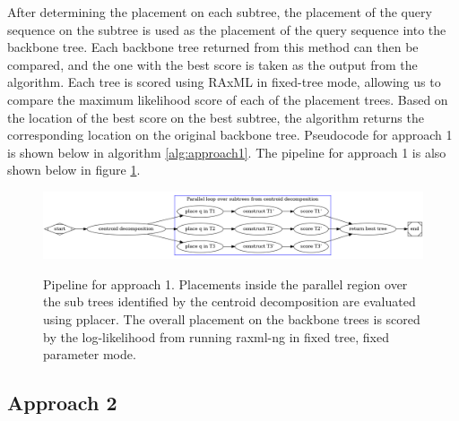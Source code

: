 \documentclass[10pt]{article}
\begin{document}
After determining the placement on each subtree, the placement of the
query sequence on the subtree is used as the placement of the query
sequence into the backbone tree. Each backbone tree returned from this
method can then be compared, and the one with the best score is taken as
the output from the algorithm. Each tree is scored using RAxML in
fixed-tree mode, allowing us to compare the maximum likelihood score of
each of the placement trees. Based on the location of the best score on
the best subtree, the algorithm returns the corresponding location on
the original backbone tree. Pseudocode for approach 1 is shown below in
algorithm \ref{alg:approach1}.
The pipeline for approach 1 is also shown below in figure \ref{fig:approach1-pipeline}.

\begin{figure}[h]
\centering
\includegraphics[width=\textwidth]{Figs/pipeline1.png}
\label{fig:approach1-pipeline}
\caption{Pipeline for approach 1. Placements inside the parallel region over
the sub trees identified by the centroid decomposition are evaluated
using pplacer.
The overall placement on the backbone trees is scored by the log-likelihood
from running raxml-ng in fixed tree, fixed parameter mode.
}
\end{figure}

\subsection{Approach 2}
\end{document}
